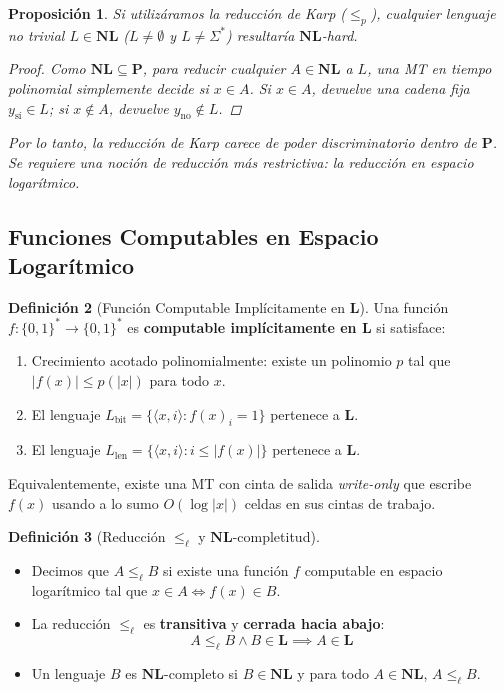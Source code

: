 \documentclass[11pt, a4paper]{article}
\theoremstyle{definition}
\newtheorem{definicion}{Definición}[section]
\theoremstyle{plain}
\newtheorem{proposicion}[definicion]{Proposición}
\theoremstyle{remark}
\newcommand{\classL}{\mathbf{L}}
\newcommand{\classNL}{\mathbf{NL}}
\newcommand{\classP}{\mathbf{P}}
\newcommand{\leL}{\le_\ell}
\newcommand{\leP}{\le_p}
\begin{document}
\begin{proposicion}
Si utilizáramos la reducción de Karp ($\leP$), cualquier lenguaje no trivial $L \in \classNL$ ($L \ne \emptyset$ y $L \ne \Sigma^*$) resultaría $\classNL$-hard.
\begin{proof}
Como $\classNL \subseteq \classP$, para reducir cualquier $A \in \classNL$ a $L$, una MT en tiempo polinomial simplemente decide si $x \in A$. Si $x \in A$, devuelve una cadena fija $y_{\text{sí}} \in L$; si $x \notin A$, devuelve $y_{\text{no}} \notin L$. 
\end{proof}
Por lo tanto, la reducción de Karp carece de poder discriminatorio dentro de $\classP$. Se requiere una noción de reducción más restrictiva: la reducción en espacio logarítmico.
\end{proposicion}

\subsection{Funciones Computables en Espacio Logarítmico}

\begin{definicion}[Función Computable Implícitamente en $\classL$]
Una función $f: {\{0,1\}}^* \to {\{0,1\}}^*$ es \textbf{computable implícitamente en $\classL$} si satisface:
\begin{enumerate}
    \item Crecimiento acotado polinomialmente: existe un polinomio $p$ tal que $|f(x)| \le p(|x|)$ para todo $x$.
    \item El lenguaje $L_{\text{bit}} = \{\langle x, i \rangle : {f(x)}_i = 1\}$ pertenece a $\classL$.
    \item El lenguaje $L_{\text{len}} = \{\langle x, i \rangle : i \le |f(x)|\}$ pertenece a $\classL$.
\end{enumerate}
Equivalentemente, existe una MT con cinta de salida \textit{write-only} que escribe $f(x)$ usando a lo sumo $O(\log |x|)$ celdas en sus cintas de trabajo.
\end{definicion}

\begin{definicion}[Reducción $\leL$ y $\classNL$-completitud]
\begin{itemize}
    \item Decimos que $A \leL B$ si existe una función $f$ computable en espacio logarítmico tal que $x \in A \iff f(x) \in B$.
    \item La reducción $\leL$ es \textbf{transitiva} y \textbf{cerrada hacia abajo}:
    \[
    A \leL B \land B \in \classL \implies A \in \classL
    \]
    \item Un lenguaje $B$ es $\classNL$-completo si $B \in \classNL$ y para todo $A \in \classNL$, $A \leL B$.
\end{itemize}
\end{definicion}
\end{document}
